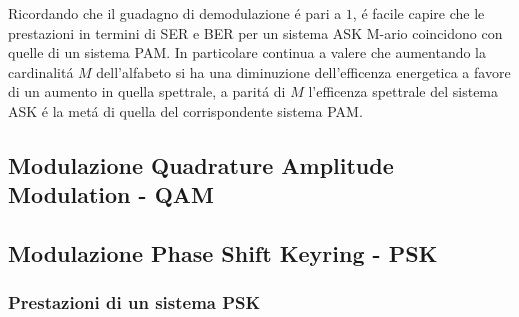        Ricordando che il guadagno di demodulazione é pari a $1$, é facile capire che le prestazioni in termini di SER e BER per un sistema ASK
        M-ario coincidono con quelle di un sistema PAM. In particolare continua a valere che aumentando la cardinalitá $M$ dell'alfabeto 
        si ha una diminuzione dell'efficenza energetica a favore di un aumento in quella spettrale, a paritá di $M$ l'efficenza 
        spettrale del sistema ASK é la metá di quella del corrispondente sistema PAM. 
    \subsection{Modulazione Quadrature Amplitude Modulation - QAM}
    \subsection{Modulazione Phase Shift Keyring - PSK}
        \subsubsection{Prestazioni di un sistema PSK}
    